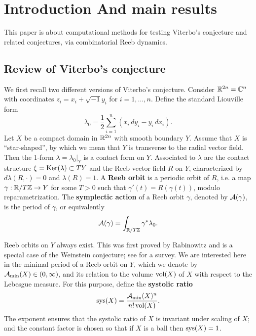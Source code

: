
\section{Introduction And main results}
\label{sec:introduction_and_main_results}

This paper is about computational methods for testing Viterbo's conjecture and related conjectures, via combinatorial Reeb dynamics.

\subsection{Review of Viterbo's conjecture}
\label{sec:reviewviterbo}

We first recall two different versions of Viterbo's conjecture.
Consider ${\mathbb R}^{2n}={\mathbb C}^n$ with coordinates $z_i=x_i+\sqrt{-1}y_i$ for $i=1,\ldots,n$. Define the standard Liouville form
\[
\lambda_0 = \frac{1}{2}\sum_{i=1}^n\left(x_i\,dy_i - y_i\,dx_i\right).
\]
Let $X$ be a compact domain in ${\mathbb R}^{2n}$ with smooth boundary $Y$. Assume that $X$ is ``star-shaped'', by which we mean that $Y$ is transverse to the radial vector field. Then the $1$-form $\lambda = \lambda_0|_Y$ is a contact form on $Y$. Associated to $\lambda$ are the contact structure $\xi=\operatorname{Ker}(\lambda)\subset TY$ and the Reeb vector field $R$ on $Y$, characterized by $d\lambda(R,\cdot)=0$ and $\lambda(R)=1$. A {\bf Reeb orbit\/} is a periodic orbit of $R$, i.e. a map $\gamma:{\mathbb R}/T{\mathbb Z}\to Y$ for some $T>0$ such that $\gamma'(t)=R(\gamma(t))$, modulo reparametrization. The {\bf symplectic action\/} of a Reeb orbit $\gamma$, denoted by ${\mathcal A}(\gamma)$, is the period of $\gamma$, or equivalently
\begin{equation}
\label{eqn:symplecticaction}
{\mathcal A}(\gamma) = \int_{{\mathbb R}/T{\mathbb Z}}\gamma^*\lambda_0.
\end{equation}

Reeb orbits on $Y$ always exist. This was first proved by Rabinowitz \cite{rabinowitz} and is a special case of the Weinstein conjecture; see \cite{tw} for a survey. We are interested here in the minimal period of a Reeb orbit on $Y$, which we denote by ${\mathcal A}_{\operatorname{min}}(X)\in(0,\infty)$, and its relation to the volume $\operatorname{vol}(X)$ of $X$ with respect to the Lebesgue measure. For this purpose, define the {\bf systolic ratio\/}
\[
\operatorname{sys}(X) = \frac{{\mathcal A}_{\operatorname{min}}(X)^n}{n!\operatorname{vol}(X)}.
\]
The exponent ensures that the systolic ratio of $X$ is invariant under scaling of $X$; and the constant factor is chosen so that if $X$ is a ball then $\operatorname{sys}(X)=1$.

